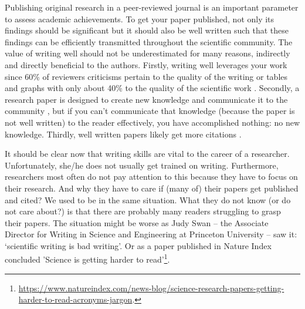 \documentclass[authoryear,12pta4paper,fleqn]{article}
\numberwithin{equation}{section}
\theoremstyle{remark}
\begin{document}
Publishing original research in a peer-reviewed  journal is an important parameter to assess academic achievements. To get your paper published, not only its findings should be significant but it should also be well written such that these findings can be efficiently transmitted throughout the scientific community. The value of writing well should not be underestimated for many reasons, indirectly and directly beneficial to the authors. Firstly, writing well leverages your work since 60\% of reviewers criticisms pertain to the quality of the writing or tables and graphs with only about 40\% to the quality of the scientific work \citep{iles1997guidebook}. Secondly, a research paper is designed to create new knowledge and communicate it to the community \citep{gopen1990science}, but if you can't communicate that knowledge (because the paper is not well written) to the reader effectively, you have accomplished nothing: no new knowledge. Thirdly, well written papers likely get more citations \citep{RePEc:nas}.


It should be clear now that writing skills are vital to the career of a researcher. Unfortunately, she/he does not usually get trained on writing. Furthermore, researchers most often do not pay attention to this because they have to focus on their research. And why they have to care if  (many of) their papers get published and cited? We used to be in the same situation.
What they do not know (or do not care about?) is that there are probably many readers struggling to grasp their papers. The situation might be worse as Judy Swan -- the Associate Director for Writing in Science and Engineering at Princeton University -- saw it: `scientific writing is bad writing'. Or as a paper published in Nature Index concluded 'Science is getting harder to read'\footnote{\url{https://www.natureindex.com/news-blog/science-research-papers-getting-harder-to-read-acronyms-jargon}.}.
\end{document}
